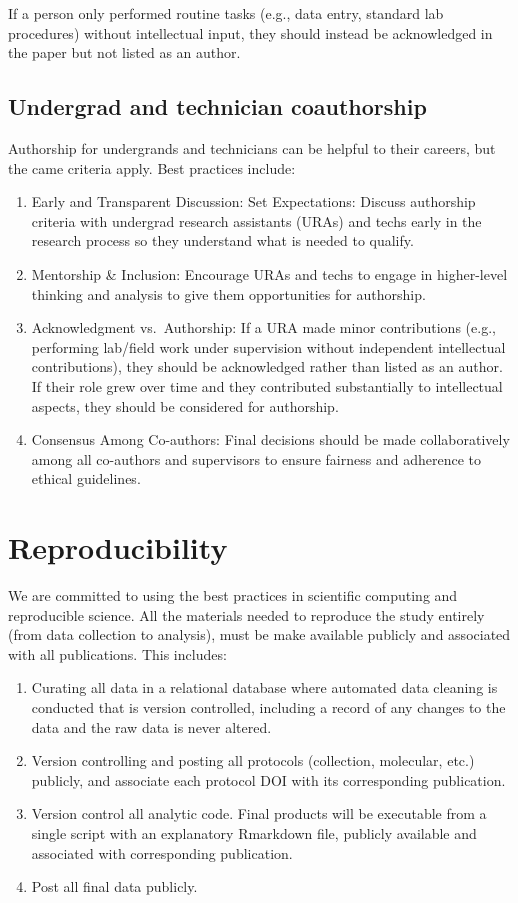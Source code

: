 \documentclass[12pt]{article}
\begin{document}
If a person only performed routine tasks (e.g., data entry, standard
lab procedures) without intellectual input, they should instead be
acknowledged in the paper but not listed as an author.

\subsection{Undergrad and technician coauthorship}

Authorship for undergrands and technicians can be helpful to their
careers, but the came criteria apply. Best practices include:

\begin{enumerate}
\item Early and Transparent Discussion: Set Expectations: Discuss
  authorship criteria with undergrad research assistants (URAs) and
  techs early in the research process so they understand what is
  needed to qualify.
\item Mentorship \& Inclusion: Encourage URAs and techs to engage in
  higher-level thinking and analysis to give them opportunities for
  authorship.
\item Acknowledgment vs.\ Authorship: If a URA made minor contributions
  (e.g., performing lab/field work under supervision without
  independent intellectual contributions), they should be acknowledged
  rather than listed as an author. If their role grew over time and
  they contributed substantially to intellectual aspects, they should
  be considered for authorship.
\item Consensus Among Co-authors: Final decisions should be made
  collaboratively among all co-authors and supervisors to ensure
  fairness and adherence to ethical guidelines.
\end{enumerate}


\section{Reproducibility}
We are committed to using the best practices in scientific computing
and reproducible science. All the
materials needed to reproduce the study entirely (from data collection
to analysis), must be make available publicly and associated with all
publications. This includes:
\begin{enumerate}
\item Curating all data in a relational database where automated
  data cleaning is conducted that is version controlled, including a
  record of any changes to the data and the raw data is never altered.
\item Version controlling and posting all protocols (collection,
  molecular, etc.) publicly, and associate each protocol DOI with its
  corresponding publication.
\item Version control all analytic code. Final products will be
  executable from a single script with an explanatory Rmarkdown file,
  publicly available and associated with corresponding publication.
\item Post all final data publicly.
\end{enumerate}
\end{document}
